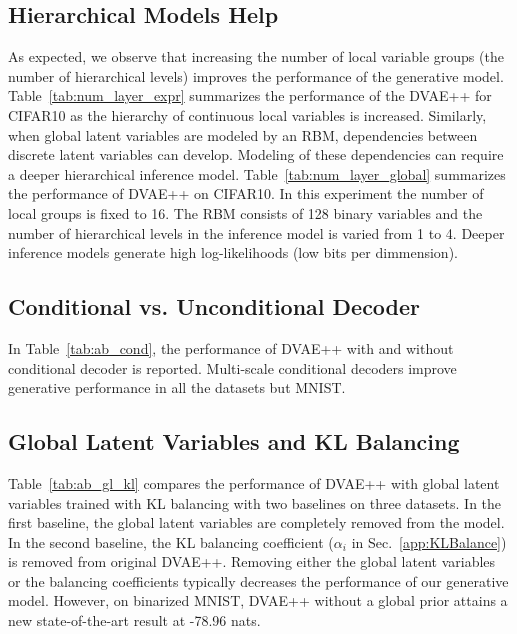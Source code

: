 \documentclass{article}
\begin{document}
\subsection{Hierarchical Models Help}
As expected, we observe that increasing the number of local variable groups (the number of hierarchical levels) 
improves the performance of the generative model. 
Table~\ref{tab:num_layer_expr} summarizes the performance of the
DVAE++ for CIFAR10 as the hierarchy of continuous local variables is increased. 
Similarly, when global latent variables are modeled 
by an RBM, dependencies between discrete latent variables can develop. Modeling of these dependencies can 
require a deeper hierarchical inference model.
Table~\ref{tab:num_layer_global} summarizes the performance of
DVAE++ on CIFAR10. In this experiment the number of local groups is fixed to 16. The RBM consists of 128 binary variables and the number of hierarchical levels in the inference model is varied from 1 to 4. Deeper inference models generate high log-likelihoods (low bits per dimmension).

\subsection{Conditional vs. Unconditional Decoder}
In Table~\ref{tab:ab_cond}, the performance of DVAE++ with and without conditional decoder is reported. Multi-scale conditional decoders improve generative performance in all the datasets but MNIST.

\subsection{Global Latent Variables and KL Balancing}
Table~\ref{tab:ab_gl_kl} compares the performance of DVAE++ with 
global latent variables trained with KL balancing with two baselines on three datasets. 
In the first baseline, the global latent variables are completely removed from the model. 
In the second baseline, the KL balancing coefficient 
($\alpha_i$ in Sec.~\ref{app:KLBalance}) is removed from original DVAE++.
Removing either the global latent variables or the balancing coefficients typically decreases the
performance of our generative model. However, on binarized MNIST, DVAE++ without a global prior attains 
a new state-of-the-art result at -78.96 nats.
\end{document}
